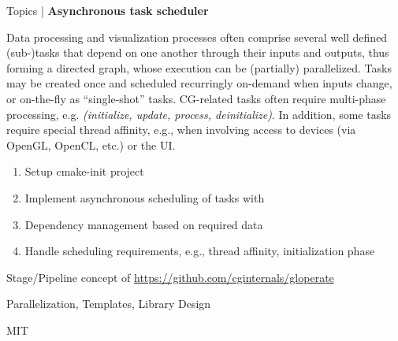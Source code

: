 \begin{frame}{Topics | \textbf{Asynchronous task scheduler}}
	
	\begin{description}[C++ Competencies]
		\item[Description] Data processing and visualization processes often comprise several well defined (sub-)tasks that depend on one another through their inputs and outputs, thus forming a directed graph, whose execution can be (partially) parallelized. Tasks may be created once and scheduled recurringly on-demand when inputs change, or on-the-fly as \enquote{single-shot} tasks. CG-related tasks often require multi-phase processing, e.g. \textit{(initialize, update, process, deinitialize)}. In addition, some tasks require special thread affinity, e.g., when involving access to devices (via OpenGL, OpenCL, etc.) or the UI.
		\item[Goals] \begin{enumerate}
				\item Setup cmake-init project
				\item Implement asynchronous scheduling of tasks with
				\item Dependency management based on required data
				\item Handle scheduling requirements, e.g., thread affinity, initialization phase
			\end{enumerate}
		\item[Starting Points] Stage/Pipeline concept of \url{https://github.com/cginternals/gloperate}
		\item[C++ Competencies] Parallelization, Templates, Library Design
		\item[License] MIT
	\end{description}
	
\end{frame}


